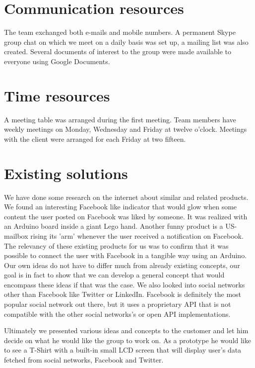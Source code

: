 \section{Communication resources}

The team exchanged both e-mails and mobile numbers. A permanent Skype
group chat on which we meet on a daily basis was set up, a mailing
list was also created. Several documents of interest to the group
were made available to everyone using Google Documents.


\section{Time resources}

A meeting table was arranged during the first meeting. Team members
have weekly meetings on Monday, Wednesday and Friday at twelve o'clock.
Meetings with the client were arranged for each Friday at two fifteen.


\section{Existing solutions}

We have done some research on the internet about similar and related products. We found an interesting
Facebook like indicator that would glow when some content the user posted on Facebook was liked by someone.
It was realized with an Arduino board inside a giant Lego hand. Another funny product is a US-mailbox rising
its 'arm'  whenever the user received a notification on Facebook. The relevancy of these existing products
for us was to confirm that it was possible to connect the user with Facebook in a tangible way using an Arduino.
Our own ideas do not have to differ much from already existing concepts, our goal is in fact to show that we can
develop a general concept that would encompass these ideas if that was the case. We also looked into social
networks other than Facebook like Twitter or LinkedIn. Facebook is definitely the most popular social network
out there, but it uses a proprietary API that is not compatible with the other social networks's or open
API implementations.

Ultimately we presented various ideas and concepts to the customer and let him decide on what he would
like the group to work on. As a prototype he would like to see a T-Shirt with a built-in small LCD screen
that will display user's data fetched from social networks, Facebook and Twitter.


